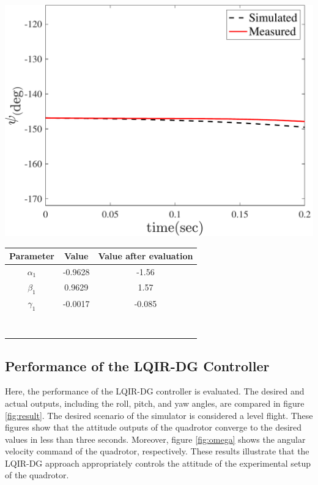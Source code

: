 \documentclass[3p,times]{elsarticle}
\newcommand\Tstrut{\rule{0pt}{2.6ex}}         %
\begin{document}
    \hfill
    \begin{minipage}[b]{0.48\linewidth}
		\centering
		\includegraphics[width=1\linewidth]{../Figure/parameter_estimation/3DOF/yaw}
		\captionsetup{justification=centering}
	\end{minipage}
    \begin{minipage}[b]{0.48\linewidth}
		\centering
		\begin{tabular}{ccc}\hline
			Parameter & Value & Value after evaluation
            \Tstrut\\ \hline
			$\alpha_1$  & -0.9628 & -1.56\Tstrut\\
            $\beta_1$  & 0.9629 & 1.57\Tstrut \\
            $\gamma_1$  & -0.0017 &-0.085\Tstrut\\ \hline
            \\\\\\\\\\\\\\\\
		\end{tabular}
	\captionsetup{justification=centering}
	\end{minipage}


\subsection{Performance of the LQIR-DG Controller}
\noindent Here, the performance of the LQIR-DG controller is evaluated. The desired and actual outputs, including the roll, pitch, and yaw angles, are compared in figure \ref{fig:result}. The desired scenario of the simulator is considered a level flight. These figures show that the attitude outputs of the quadrotor converge to the desired values in less than three seconds. Moreover, figure \ref{fig:omega} shows the angular velocity command of the quadrotor, 
respectively. These results illustrate that the LQIR-DG approach appropriately controls the attitude of the experimental setup of the quadrotor.
\end{document}
